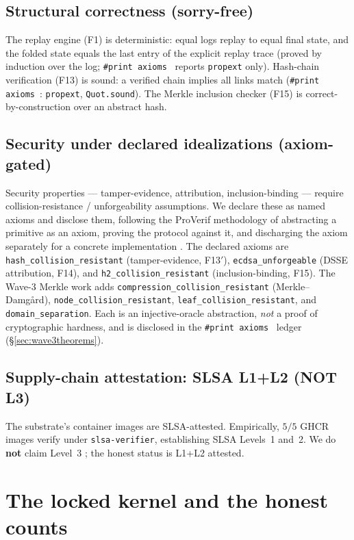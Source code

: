 \documentclass[11pt]{article}
\theoremstyle{plain}
\theoremstyle{definition}
\theoremstyle{remark}
\newcommand{\printax}[1]{\texttt{\#print axioms}~\texttt{#1}}
\begin{document}
\subsection{Structural correctness (sorry-free)}
The replay engine (F1) is deterministic: equal logs replay to equal final state, and
the folded state equals the last entry of the explicit replay trace (proved by
induction over the log; \printax{} reports \texttt{propext} only). Hash-chain
verification (F13) is sound: a verified chain implies all links match
(\printax{}: \texttt{propext}, \texttt{Quot.sound}). The Merkle inclusion checker
(F15) is correct-by-construction over an abstract hash.

\subsection{Security under declared idealizations (axiom-gated)}
Security properties --- tamper-evidence, attribution, inclusion-binding --- require
collision-resistance / unforgeability assumptions. We declare these as named axioms
and disclose them, following the ProVerif methodology of abstracting a primitive as
an axiom, proving the protocol against it, and discharging the axiom separately for a
concrete implementation \cite{proverif}. The declared axioms are
\texttt{hash\_collision\_resistant} (tamper-evidence, F13$'$),
\texttt{ecdsa\_unforgeable} (DSSE attribution, F14), and
\texttt{h2\_collision\_resistant} (inclusion-binding, F15). The Wave-3 Merkle work
adds \texttt{compression\_collision\_resistant} (Merkle--Damg{\aa}rd),
\texttt{node\_collision\_resistant}, \texttt{leaf\_collision\_resistant}, and
\texttt{domain\_separation}. Each is an injective-oracle abstraction, \emph{not} a
proof of cryptographic hardness, and is disclosed in the \printax{} ledger
(\S\ref{sec:wave3theorems}).

\subsection{Supply-chain attestation: SLSA L1+L2 (NOT L3)}
The substrate's container images are SLSA-attested. Empirically, $5/5$ GHCR images
verify under \texttt{slsa-verifier}, establishing SLSA Levels~1 and~2. We do
\textbf{not} claim Level~3 \cite{slsa}; the honest status is L1+L2 attested.

\section{The locked kernel and the honest counts}
\label{sec:kernel}
\end{document}
